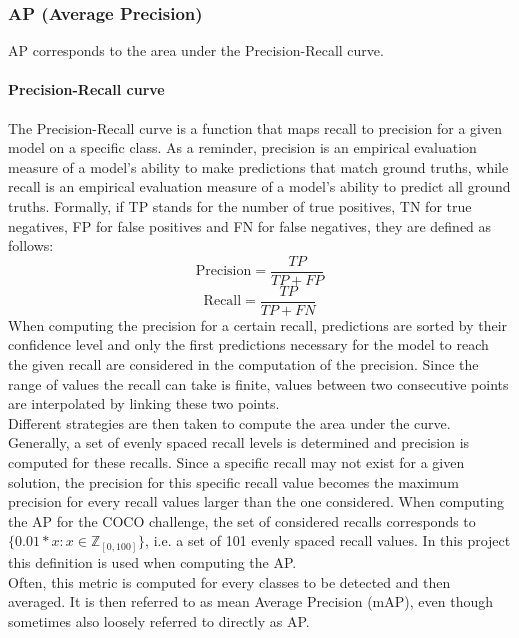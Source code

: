 \subsubsection{AP (Average Precision)}
\label{ap}
AP corresponds to the area under the Precision-Recall curve.

\paragraph{Precision-Recall curve}
The Precision-Recall curve is a function that maps recall to precision for a given model on a specific class. As a reminder, precision is an empirical evaluation measure of a model's ability to make predictions that match ground truths, while recall is an empirical evaluation measure of a model's ability to predict all ground truths. Formally, if TP stands for the number of true positives, TN for true negatives, FP for false positives and FN for false negatives, they are defined as follows:
\[ \text{Precision} = \frac{TP}{TP + FP} \]
\[ \text{Recall} = \frac{TP}{TP + FN} \]
When computing the precision for a certain recall, predictions are sorted by their confidence level and only the first predictions necessary for the model to reach the given recall are considered in the computation of the precision. Since the range of values the recall can take is finite, values between two consecutive points are interpolated by linking these two points. \\
Different strategies are then taken to compute the area under the curve. Generally, a set of evenly spaced recall levels is determined and precision is computed for these recalls. Since a specific recall may not exist for a given solution, the precision for this specific recall value becomes the maximum precision for every recall values larger than the one considered. When computing the AP for the COCO challenge, the set of considered recalls corresponds to $\{0.01*x : x \in \mathbb{Z}_{[0, 100]} \}$, i.e. a set of 101 evenly spaced recall values. In this project this definition is used when computing the AP. \\
Often, this metric is computed for every classes to be detected and then averaged. It is then referred to as mean Average Precision (mAP), even though sometimes also loosely referred to directly as AP. 

